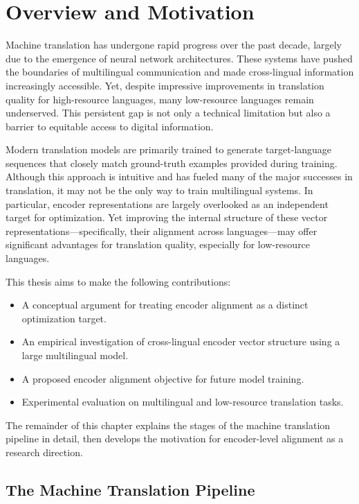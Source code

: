 \chapter{Overview and Motivation}

Machine translation has undergone rapid progress over the past decade, largely due to the emergence of neural network architectures. These systems have pushed the boundaries of multilingual communication and made cross-lingual information increasingly accessible. Yet, despite impressive improvements in translation quality for high-resource languages, many low-resource languages remain underserved. This persistent gap is not only a technical limitation but also a barrier to equitable access to digital information.

Modern translation models are primarily trained to generate target-language sequences that closely match ground-truth examples provided during training. Although this approach is intuitive and has fueled many of the major successes in translation, it may not be the only way to train multilingual systems. In particular, encoder representations are largely overlooked as an independent target for optimization. Yet improving the internal structure of these vector representations---specifically, their alignment across languages---may offer significant advantages for translation quality, especially for low-resource languages.

This thesis aims to make the following contributions:

\begin{itemize}
  \item A conceptual argument for treating encoder alignment as a distinct optimization target.
  \item An empirical investigation of cross-lingual encoder vector structure using a large multilingual model.
  \item A proposed encoder alignment objective for future model training.
  \item Experimental evaluation on multilingual and low-resource translation tasks.
\end{itemize}

The remainder of this chapter explains the stages of the machine translation pipeline in detail, then develops the motivation for encoder-level alignment as a research direction.

\section{The Machine Translation Pipeline}

